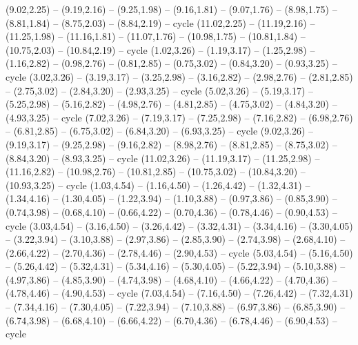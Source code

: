 \expandafter\def\csname geo:Tissot:k11\endcsname{
  (9.02,2.25) -- (9.19,2.16) -- (9.25,1.98) -- (9.16,1.81) -- (9.07,1.76) -- (8.98,1.75) -- (8.81,1.84) -- (8.75,2.03) -- (8.84,2.19) -- cycle}
\expandafter\def\csname geo:Tissot:k12\endcsname{
  (11.02,2.25) -- (11.19,2.16) -- (11.25,1.98) -- (11.16,1.81) -- (11.07,1.76) -- (10.98,1.75) -- (10.81,1.84) -- (10.75,2.03) -- (10.84,2.19) -- cycle}
\expandafter\def\csname geo:Tissot:k13\endcsname{
  (1.02,3.26) -- (1.19,3.17) -- (1.25,2.98) -- (1.16,2.82) -- (0.98,2.76) -- (0.81,2.85) -- (0.75,3.02) -- (0.84,3.20) -- (0.93,3.25) -- cycle}
\expandafter\def\csname geo:Tissot:k14\endcsname{
  (3.02,3.26) -- (3.19,3.17) -- (3.25,2.98) -- (3.16,2.82) -- (2.98,2.76) -- (2.81,2.85) -- (2.75,3.02) -- (2.84,3.20) -- (2.93,3.25) -- cycle}
\expandafter\def\csname geo:Tissot:k15\endcsname{
  (5.02,3.26) -- (5.19,3.17) -- (5.25,2.98) -- (5.16,2.82) -- (4.98,2.76) -- (4.81,2.85) -- (4.75,3.02) -- (4.84,3.20) -- (4.93,3.25) -- cycle}
\expandafter\def\csname geo:Tissot:k16\endcsname{
  (7.02,3.26) -- (7.19,3.17) -- (7.25,2.98) -- (7.16,2.82) -- (6.98,2.76) -- (6.81,2.85) -- (6.75,3.02) -- (6.84,3.20) -- (6.93,3.25) -- cycle}
\expandafter\def\csname geo:Tissot:k17\endcsname{
  (9.02,3.26) -- (9.19,3.17) -- (9.25,2.98) -- (9.16,2.82) -- (8.98,2.76) -- (8.81,2.85) -- (8.75,3.02) -- (8.84,3.20) -- (8.93,3.25) -- cycle}
\expandafter\def\csname geo:Tissot:k18\endcsname{
  (11.02,3.26) -- (11.19,3.17) -- (11.25,2.98) -- (11.16,2.82) -- (10.98,2.76) -- (10.81,2.85) -- (10.75,3.02) -- (10.84,3.20) -- (10.93,3.25) -- cycle}
\expandafter\def\csname geo:Tissot:k19\endcsname{
  (1.03,4.54) -- (1.16,4.50) -- (1.26,4.42) -- (1.32,4.31) -- (1.34,4.16) -- (1.30,4.05) -- (1.22,3.94) -- (1.10,3.88) -- (0.97,3.86) -- (0.85,3.90) -- (0.74,3.98) -- (0.68,4.10) -- (0.66,4.22) -- (0.70,4.36) -- (0.78,4.46) -- (0.90,4.53) -- cycle}
\expandafter\def\csname geo:Tissot:k20\endcsname{
  (3.03,4.54) -- (3.16,4.50) -- (3.26,4.42) -- (3.32,4.31) -- (3.34,4.16) -- (3.30,4.05) -- (3.22,3.94) -- (3.10,3.88) -- (2.97,3.86) -- (2.85,3.90) -- (2.74,3.98) -- (2.68,4.10) -- (2.66,4.22) -- (2.70,4.36) -- (2.78,4.46) -- (2.90,4.53) -- cycle}
\expandafter\def\csname geo:Tissot:k21\endcsname{
  (5.03,4.54) -- (5.16,4.50) -- (5.26,4.42) -- (5.32,4.31) -- (5.34,4.16) -- (5.30,4.05) -- (5.22,3.94) -- (5.10,3.88) -- (4.97,3.86) -- (4.85,3.90) -- (4.74,3.98) -- (4.68,4.10) -- (4.66,4.22) -- (4.70,4.36) -- (4.78,4.46) -- (4.90,4.53) -- cycle}
\expandafter\def\csname geo:Tissot:k22\endcsname{
  (7.03,4.54) -- (7.16,4.50) -- (7.26,4.42) -- (7.32,4.31) -- (7.34,4.16) -- (7.30,4.05) -- (7.22,3.94) -- (7.10,3.88) -- (6.97,3.86) -- (6.85,3.90) -- (6.74,3.98) -- (6.68,4.10) -- (6.66,4.22) -- (6.70,4.36) -- (6.78,4.46) -- (6.90,4.53) -- cycle}
